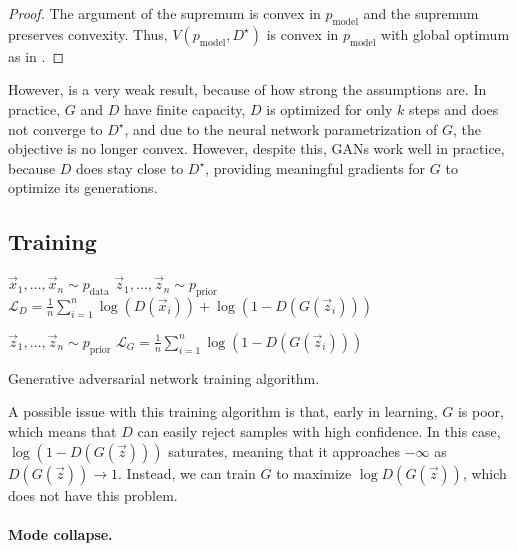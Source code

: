 \begin{proof}
    The argument of the supremum is convex in $p_{\mathrm{model}}$ and the supremum preserves
    convexity. Thus, $V(p_{\mathrm{model}}, D^\star)$ is convex in $p_{\mathrm{model}}$ with global
    optimum as in .
\end{proof}

However,  is a very weak result, because of how strong the assumptions
are. In practice, $G$ and $D$ have finite capacity, $D$ is optimized for only $k$ steps and does
not converge to $D^\star$, and due to the neural network parametrization of $G$, the objective is
no longer convex. However, despite this, GANs work well in practice, because $D$ does stay close to
$D^\star$, providing meaningful gradients for $G$ to optimize its generations.

\subsection{Training}

\begin{algorithm}
    \begin{algorithmic}
        \State $\vec{x}_1, \ldots, \vec{x}_n \sim p_{\mathrm{data}}$
        \State $\vec{z}_1, \ldots, \vec{z}_n \sim p_{\mathrm{prior}}$
        \State $\mathcal{L}_D = \frac{1}{n} \sum_{i=1}^{n} \log (D(\vec{x}_i)) + \log(1 - D(G(\vec{z}_i)))$
        \End

        \State $\vec{z}_1, \ldots, \vec{z}_n \sim p_{\mathrm{prior}}$
        \State $\mathcal{L}_G = \frac{1}{n} \sum_{i=1}^{n} \log(1 - D(G(\vec{z}_i)))$
        \EndWhile
    \end{algorithmic}
    \caption{Generative adversarial network training algorithm.}
    \label{alg:gan}
\end{algorithm}

A possible issue with this training algorithm is that, early in learning, $G$ is poor, which means
that $D$ can easily reject samples with high confidence. In this case, $\log(1 - D(G(\vec{z})))$
saturates, meaning that it approaches $-\infty$ as $D(G(\vec{z})) \to 1$. Instead, we can train $G$
to maximize $\log D(G(\vec{z}))$, which does not have this problem.

\paragraph{Mode collapse.}

